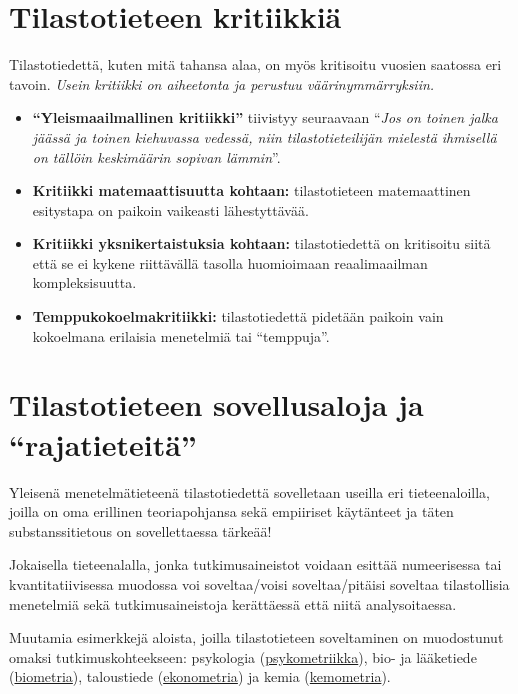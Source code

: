 \documentclass[
]{report}
\begin{document}
\hypertarget{tilastotieteen-kritiikkiuxe4}{%
\section{Tilastotieteen kritiikkiä}\label{tilastotieteen-kritiikkiuxe4}}

Tilastotiedettä, kuten mitä tahansa alaa, on myös kritisoitu vuosien
saatossa eri tavoin. \emph{Usein kritiikki on aiheetonta ja perustuu
väärinymmärryksiin.}

\begin{itemize}
\item
  \textbf{``Yleismaailmallinen kritiikki''} tiivistyy seuraavaan
  ``\emph{Jos on toinen jalka jäässä ja toinen kiehuvassa vedessä, niin
  tilastotieteilijän mielestä ihmisellä on tällöin keskimäärin sopivan
  lämmin}''.
\item
  \textbf{Kritiikki matemaattisuutta kohtaan:} tilastotieteen
  matemaattinen esitystapa on paikoin vaikeasti lähestyttävää.
\item
  \textbf{Kritiikki yksnikertaistuksia kohtaan:} tilastotiedettä on
  kritisoitu siitä että se ei kykene riittävällä tasolla huomioimaan
  reaalimaailman kompleksisuutta.
\item
  \textbf{Temppukokoelmakritiikki:} tilastotiedettä pidetään paikoin
  vain kokoelmana erilaisia menetelmiä tai ``temppuja''.
\end{itemize}

\hypertarget{tilastotieteen-sovellusaloja-ja-rajatieteituxe4}{%
\section{Tilastotieteen sovellusaloja ja
``rajatieteitä''}\label{tilastotieteen-sovellusaloja-ja-rajatieteituxe4}}

Yleisenä menetelmätieteenä tilastotiedettä sovelletaan useilla eri
tieteenaloilla, joilla on oma erillinen teoriapohjansa sekä empiiriset
käytänteet ja täten substanssitietous on sovellettaessa tärkeää!

Jokaisella tieteenalalla, jonka tutkimusaineistot voidaan esittää
numeerisessa tai kvantitatiivisessa muodossa voi soveltaa/voisi
soveltaa/pitäisi soveltaa tilastollisia menetelmiä sekä
tutkimusaineistoja kerättäessä että niitä analysoitaessa.

Muutamia esimerkkejä aloista, joilla tilastotieteen soveltaminen on
muodostunut omaksi tutkimuskohteekseen: psykologia
(\href{https://en.wikipedia.org/wiki/Psychometrics}{psykometriikka}),
bio- ja lääketiede
(\href{https://en.wikipedia.org/wiki/Biometrics}{biometria}),
taloustiede
(\href{https://en.wikipedia.org/wiki/Econometrics}{ekonometria}) ja
kemia (\href{https://en.wikipedia.org/wiki/Chemometrics}{kemometria}).
\end{document}
